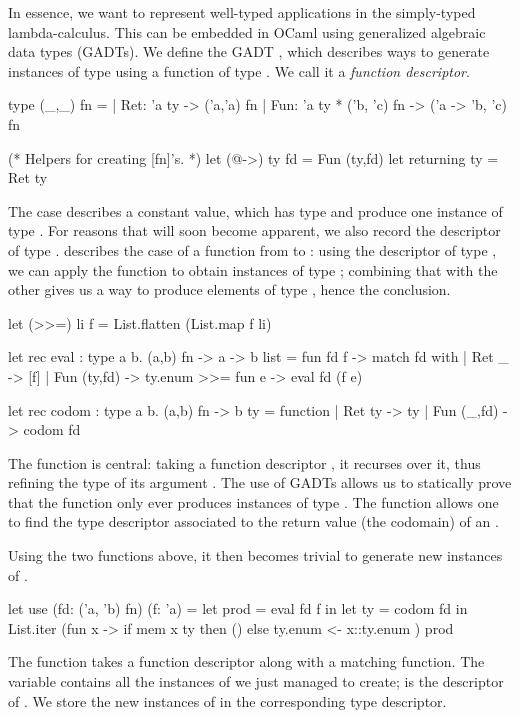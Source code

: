In essence, we want to represent well-typed applications in the
simply-typed lambda-calculus. This can be embedded in OCaml using generalized
algebraic data types (GADTs). We define the GADT , which
describes ways to generate instances of type  using a function of type
. We call it a \emph{function descriptor}.
%
\begin{ocamlcode}
type (_,_) fn =
| Ret: 'a ty -> ('a,'a) fn
| Fun: 'a ty * ('b, 'c) fn -> ('a -> 'b, 'c) fn

(* Helpers for creating [fn]'s. *)
let (@->) ty fd = Fun (ty,fd)
let returning ty = Ret ty
\end{ocamlcode}
%
The  case describes a constant value, which has type  and
produce one instance of type . For reasons that will soon become
apparent, we also record the descriptor of type .  describes
the case of a function from  to : using the descriptor of type
, we can apply the function to obtain instances of type ;
combining that with the other  gives us a way to produce
elements of type , hence the  conclusion.
%
\begin{ocamlcode}
let (>>=) li f = List.flatten (List.map f li)

let rec eval : type a b. (a,b) fn -> a -> b list =
  fun fd f ->
    match fd with
    | Ret _ -> [f]
    | Fun (ty,fd) ->
        ty.enum >>= fun e -> eval fd (f e)

let rec codom : type a b. (a,b) fn -> b ty =
  function
    | Ret ty -> ty
    | Fun (_,fd) -> codom fd
\end{ocamlcode}
%
The  function is central: taking a function descriptor , it
recurses over it, thus refining the type of its argument . The use of
GADTs allows us to statically prove that the  function only ever
produces instances of type .
%
The  function allows one to find the type
descriptor associated to the return value (the codomain) of an .

Using the two functions above, it then becomes trivial to generate new instances
of .
%
\begin{ocamlcode}
let use (fd: ('a, 'b) fn) (f: 'a) =
  let prod = eval fd f in
  let ty = codom fd in
  List.iter (fun x -> 
    if mem x ty then () else ty.enum <- x::ty.enum
  ) prod
\end{ocamlcode}
%
The function takes a function descriptor along with a matching function. The
 variable contains all the instances of  we just managed to
create;  is the descriptor of . We store the new
instances of  in the corresponding type descriptor.

